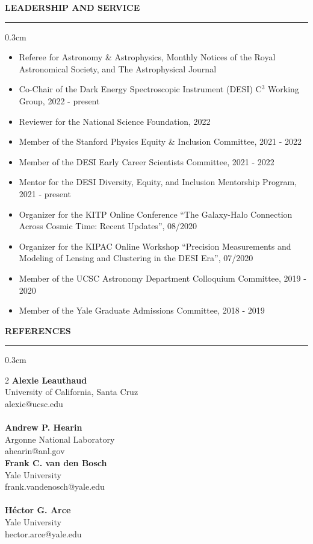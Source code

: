 \documentclass[12pt]{article}
\renewenvironment{section}[1]
  {
  \medskip
  {\color{yaleblue} \MakeUppercase{\bf #1}}
  \smallskip
  \hrule
  \medskip
  \begin{adjustwidth}{0.3cm}{}
  }
  {
  \end{adjustwidth}
  }
\newcommand{\entry}[3]{{\bf #1} \hfill {#2} \\ {#3}}
\begin{document}
\begin{section}{Leadership and Service}
  \begin{itemize}[leftmargin=0.5cm, topsep=0pt, itemsep=0pt, partopsep=0pt, parsep=0pt]
    \item Referee for Astronomy \& Astrophysics, Monthly Notices of the Royal Astronomical Society, and The Astrophysical Journal
    \item Co-Chair of the Dark Energy Spectroscopic Instrument (DESI) C$^3$ Working Group, 2022 - present
    \item Reviewer for the National Science Foundation, 2022
    \item Member of the Stanford Physics Equity \& Inclusion Committee, 2021 - 2022
    \item Member of the DESI Early Career Scientists Committee, 2021 - 2022
    \item Mentor for the DESI Diversity, Equity, and Inclusion Mentorship Program, 2021 - present
    \item Organizer for the KITP Online Conference ``The Galaxy-Halo Connection Across Cosmic Time: Recent Updates'', 08/2020
    \item Organizer for the KIPAC Online Workshop ``Precision Measurements and Modeling of Lensing and Clustering in the DESI Era'', 07/2020
    \item Member of the UCSC Astronomy Department Colloquium Committee, 2019 - 2020
    \item Member of the Yale Graduate Admissions Committee, 2018 - 2019
  \end{itemize}
\end{section}

\newpage

\begin{section}{References}
    \begin{multicols*}{2}
    \entry{Alexie Leauthaud}{}{University of California, Santa Cruz\\alexie@ucsc.edu} \\ \\
    \entry{Andrew P. Hearin}{}{Argonne National Laboratory\\ahearin@anl.gov} \columnbreak \\
    \entry{Frank C. van den Bosch}{}{Yale University\\frank.vandenosch@yale.edu} \\ \\
    \entry{H\'{e}ctor G. Arce}{}{Yale University\\hector.arce@yale.edu}
    \end{multicols*}
\end{section}
\end{document}
